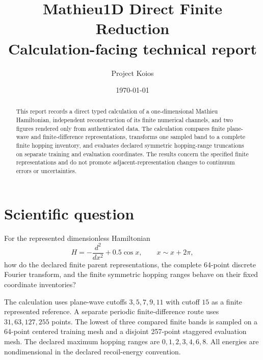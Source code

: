 \documentclass[11pt]{article}
\title{Mathieu1D Direct Finite Reduction\\
\large Calculation-facing technical report}
\author{Project Koios}
\date{\today}
\begin{document}
\maketitle

\begin{center}
\end{center}

\begin{abstract}
This report records a direct typed calculation of a one-dimensional Mathieu
Hamiltonian, independent reconstruction of its finite numerical channels, and two
figures rendered only from authenticated data.  The calculation compares finite
plane-wave and finite-difference representations, transforms one sampled band to a
complete finite hopping inventory, and evaluates declared symmetric hopping-range
truncations on separate training and evaluation coordinates.  The results concern the
specified finite representations and do not promote adjacent-representation changes
to continuum errors or uncertainties.
\end{abstract}

\section{Scientific question}

For the represented dimensionless Hamiltonian
\begin{equation}
  H=-\frac{d^2}{dx^2}+0.5\cos x,
  \qquad x\sim x+2\pi,
\end{equation}
how do the declared finite parent representations, the complete 64-point discrete
Fourier transform, and the finite symmetric hopping ranges behave on their fixed
coordinate inventories?

The calculation uses plane-wave cutoffs $3,5,7,9,11$ with cutoff $15$ as a finite
represented reference.  A separate periodic finite-difference route uses
$31,63,127,255$ points.  The lowest of three compared finite bands is sampled on a
64-point centered training mesh and a disjoint 257-point staggered evaluation mesh.
The declared maximum hopping ranges are $0,1,2,3,4,6,8$.  All energies are
nondimensional in the declared recoil-energy convention.
\end{document}
